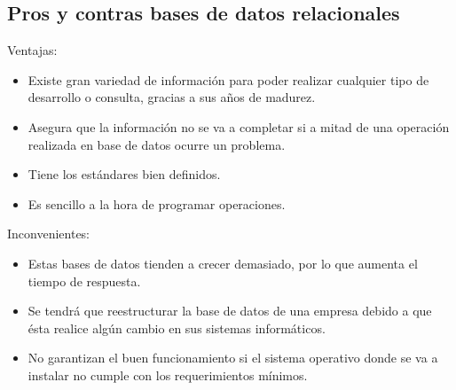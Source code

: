 \documentclass[12pt]{report} %
\begin{document}
	\subsection{Pros y contras bases de datos relacionales}
	Ventajas:
	 \begin{itemize}
		\item Existe gran variedad de información para poder realizar cualquier tipo de desarrollo o consulta, gracias a sus años de madurez.
		\item Asegura que la información no se va a completar si a mitad de una operación realizada en base de datos ocurre un problema.
		\item Tiene los estándares bien definidos.
		\item Es sencillo a la hora de programar operaciones.
	\end{itemize}
	Inconvenientes:
		 \begin{itemize}
		\item Estas bases de datos tienden a crecer demasiado, por lo que aumenta el tiempo de respuesta.
		\item Se tendrá que reestructurar la base de datos de una empresa debido a que ésta realice algún cambio en sus sistemas informáticos.
		\item No garantizan el buen funcionamiento si el sistema operativo donde se va a instalar no cumple con los requerimientos mínimos.
	\end{itemize}
\end{document}

